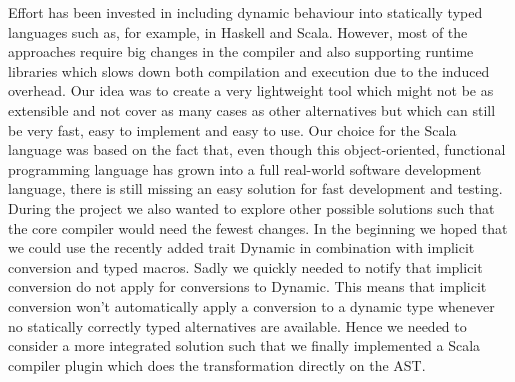  Effort has been invested in including dynamic behaviour into statically typed languages such as, for example, in Haskell and Scala. However, most of the approaches require big changes in the compiler and also supporting runtime libraries which slows down both compilation and execution due to the induced overhead. Our idea was to create a very lightweight tool which might not be as extensible and not cover as many cases as other alternatives but which can still be very fast, easy to implement and easy to use. Our choice for the Scala language was based on the fact that, even though this object-oriented, functional programming language has grown into a full real-world software development language, there is still missing an easy solution for fast development and testing. During the project we also wanted to explore other possible solutions such that the core compiler would need the fewest changes. In the beginning we hoped that we could use the recently added trait {\ttfamily Dynamic} in combination with implicit conversion and typed macros. Sadly we quickly needed to notify that implicit conversion do not apply for conversions to Dynamic. This means that implicit conversion won't automatically apply a conversion to a dynamic type whenever no statically correctly typed alternatives are available. Hence we needed to consider a more integrated solution such that we finally implemented a Scala compiler plugin which does the transformation directly on the AST.
